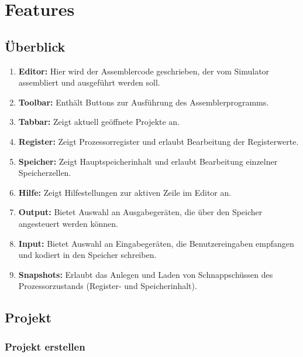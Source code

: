 
\section{Features}

\subsection*{Überblick}


\begin{enumerate}
\item \textbf{Editor:} Hier wird der Assemblercode geschrieben, der vom
Simulator assembliert und ausgeführt werden soll.
\item \textbf{Toolbar:} Enthält Buttons zur Ausführung des Assemblerprogramms.
\item \textbf{Tabbar:} Zeigt aktuell geöffnete Projekte an.
\item \textbf{Register:} Zeigt Prozessorregister und erlaubt Bearbeitung der
Registerwerte.
\item \textbf{Speicher:} Zeigt Hauptspeicherinhalt und erlaubt Bearbeitung
einzelner Speicherzellen.
\item \textbf{Hilfe:} Zeigt Hilfestellungen zur aktiven Zeile im Editor an.
\item \textbf{Output:} Bietet Auswahl an Ausgabegeräten, die über den Speicher
angesteuert werden können.
\item \textbf{Input:} Bietet Auswahl an Eingabegeräten, die Benutzereingaben
empfangen und kodiert in den Speicher schreiben.
\item \textbf{Snapshots:} Erlaubt das Anlegen und Laden von Schnappschüssen
des Prozessorzustands (Register- und Speicherinhalt).
\end{enumerate}


\subsection{Projekt}

\subsubsection{Projekt erstellen}
\label{sec:project_creation}

